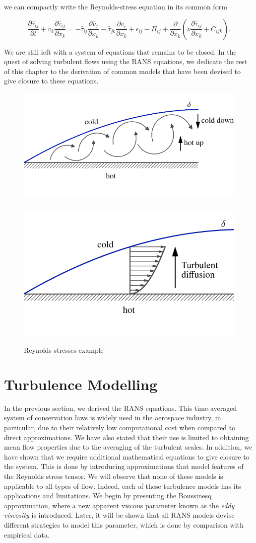 we can compactly write the Reynolds-stress equation in its common form
\begin{eqBox}
	\begin{equation}
		\frac{\partial \hat \tau_{ij}}{\partial t} + \overline v_k \frac{\partial \hat \tau_{ij}}{\partial x_k}
		= - \hat\tau_{ij}\frac{\partial \overline v_j}{\partial x_k} 
		- \hat\tau_{jk}\frac{\partial \overline v_i }{\partial x_k} 
		+ \epsilon_{ij} - \Pi_{ij}
		+ \frac{\partial}{\partial x_k} \left(\nu \frac{\partial \hat\tau_{ij}}{\partial x_k} + C_{ijk}\right).
	\end{equation}
\end{eqBox}
We are still left with a system of equations that remains to be closed. In the quest of solving turbulent flows using the RANS equations, we dedicate the rest of this chapter to the derivation of common models that have been devised to give closure to these equations.
\begin{figure}[htbp]
	\centering
	\includegraphics[height=0.25\linewidth]{Pictures/ch7_heated_plate_flow_0}~
	\includegraphics[height=0.25\linewidth]{Pictures/ch7_heated_plate_flow_1}
	\caption{Reynolds stresses example}
	\label{fig:heated_plate_flow}
\end{figure}

\section{Turbulence Modelling}
In the previous section, we derived the RANS equations. This time-averaged system of conservation laws is widely used in the aerospace industry, in particular, due to their relatively low computational cost when compared to direct approximations. We have also stated that their use is limited to obtaining mean flow properties due to the averaging of the turbulent scales. In addition, we have shown that we require additional mathematical equations to give closure to the system. This is done by introducing approximations that model features of the Reynolds stress tensor.  We will observe that none of these models is applicable to all types of flow. Indeed, each of these turbulence models has its applications and limitations. We begin by presenting the Boussinesq approximation, where a new apparent viscous parameter known as the \textit{eddy viscosity} is introduced. Later, it will be shown that all RANS models devise different strategies to model this parameter, which is done by comparison with empirical data. 

